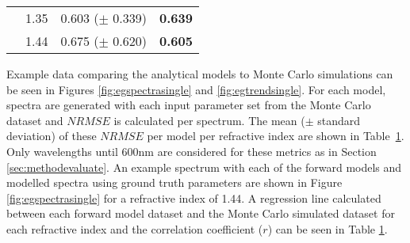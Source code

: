\begin{table}[bhp]
\begin{tabular}{|c|c|c|c|}
        & 1.35 & 0.603 ($\pm$ 0.339) & \textbf{0.639} \\
        & 1.44 & 0.675 ($\pm$ 0.620) & \textbf{0.605} \\
        \hline
    \end{tabular}
    \label{tb:NRMSEsingle}
\end{table}

Example data comparing the analytical models to Monte Carlo simulations can be seen in Figures \ref{fig:egspectrasingle} and \ref{fig:egtrendsingle}.
For each model, spectra are generated with each
input
parameter set from the Monte Carlo dataset and $NRMSE$ is calculated per spectrum. The mean ($\pm$ standard deviation) of these $NRMSE$ per model per refractive index are shown in Table~\ref{tb:NRMSEsingle}.
Only wavelengths until 600nm are considered for these metrics as in Section \ref{sec:methodevaluate}. An example spectrum with each of the forward models and modelled spectra using ground truth parameters are shown in Figure \ref{fig:egspectrasingle} for a refractive index of 1.44. A regression line calculated between each forward model dataset and the Monte Carlo simulated dataset for each refractive index and the correlation coefficient ($r$) can be seen in Table \ref{tb:NRMSEsingle}.

